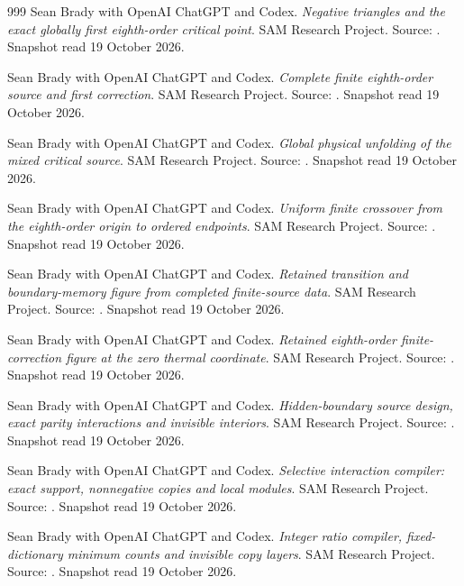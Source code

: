\begin{thebibliography}{999}
 Sean Brady with OpenAI ChatGPT and Codex. \emph{Negative triangles and the exact globally first eighth-order critical point}. SAM Research Project. Source: . Snapshot read 19 October 2026.

 Sean Brady with OpenAI ChatGPT and Codex. \emph{Complete finite eighth-order source and first correction}. SAM Research Project. Source: . Snapshot read 19 October 2026.

 Sean Brady with OpenAI ChatGPT and Codex. \emph{Global physical unfolding of the mixed critical source}. SAM Research Project. Source: . Snapshot read 19 October 2026.

 Sean Brady with OpenAI ChatGPT and Codex. \emph{Uniform finite crossover from the eighth-order origin to ordered endpoints}. SAM Research Project. Source: . Snapshot read 19 October 2026.

 Sean Brady with OpenAI ChatGPT and Codex. \emph{Retained transition and boundary-memory figure from completed finite-source data}. SAM Research Project. Source: . Snapshot read 19 October 2026.

 Sean Brady with OpenAI ChatGPT and Codex. \emph{Retained eighth-order finite-correction figure at the zero thermal coordinate}. SAM Research Project. Source: . Snapshot read 19 October 2026.

 Sean Brady with OpenAI ChatGPT and Codex. \emph{Hidden-boundary source design, exact parity interactions and invisible interiors}. SAM Research Project. Source: . Snapshot read 19 October 2026.

 Sean Brady with OpenAI ChatGPT and Codex. \emph{Selective interaction compiler: exact support, nonnegative copies and local modules}. SAM Research Project. Source: . Snapshot read 19 October 2026.

 Sean Brady with OpenAI ChatGPT and Codex. \emph{Integer ratio compiler, fixed-dictionary minimum counts and invisible copy layers}. SAM Research Project. Source: . Snapshot read 19 October 2026.


\end{thebibliography}

